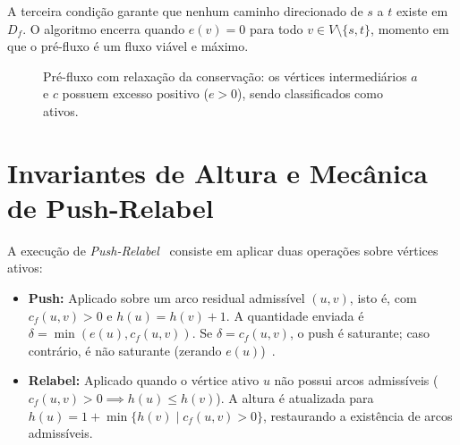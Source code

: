 A terceira condição garante que nenhum caminho direcionado de $s$ a $t$ existe em $D_f$. O algoritmo encerra quando $e(v) = 0$ para todo $v \in V \setminus \{s, t\}$, momento em que o pré-fluxo é um fluxo viável e máximo.

\begin{figure}[!ht]
\centering
{}
\caption{Pré-fluxo com relaxação da conservação: os vértices intermediários $a$ e $c$ possuem excesso positivo ($e > 0$), sendo classificados como ativos.}
\label{fig:prefluxo}
\end{figure}


\section{Invariantes de Altura e Mecânica de Push-Relabel}\label{sec:push_relabel}

A execução de \textit{Push-Relabel}~\cite{goldberg1988new} consiste em aplicar duas operações sobre vértices ativos:

\begin{itemize}
    \item \textbf{Push:} Aplicado sobre um arco residual admissível $(u,v)$, isto é, com $c_f(u,v) > 0$ e $h(u) = h(v) + 1$. A quantidade enviada é $\delta = \min(e(u), c_f(u,v))$. Se $\delta = c_f(u,v)$, o push é saturante; caso contrário, é não saturante (zerando $e(u)$)~\cite{cook1998combinatorial}.

    \item \textbf{Relabel:} Aplicado quando o vértice ativo $u$ não possui arcos admissíveis ($c_f(u,v) > 0 \implies h(u) \le h(v)$). A altura é atualizada para $h(u) = 1 + \min \{h(v) \mid c_f(u,v) > 0\}$, restaurando a existência de arcos admissíveis.
\end{itemize}

